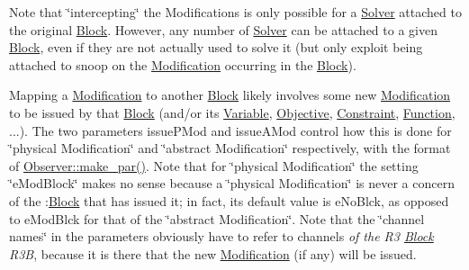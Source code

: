 Note that \char`\"{}intercepting\char`\"{} the Modifications is only possible for a \mbox{\hyperlink{class_s_m_spp__di__unipi__it_1_1_solver}{Solver}} attached to the original \mbox{\hyperlink{class_s_m_spp__di__unipi__it_1_1_block}{Block}}. However, any number of \mbox{\hyperlink{class_s_m_spp__di__unipi__it_1_1_solver}{Solver}} can be attached to a given \mbox{\hyperlink{class_s_m_spp__di__unipi__it_1_1_block}{Block}}, even if they are not actually used to solve it (but only exploit being attached to snoop on the \mbox{\hyperlink{class_s_m_spp__di__unipi__it_1_1_modification}{Modification}} occurring in the \mbox{\hyperlink{class_s_m_spp__di__unipi__it_1_1_block}{Block}}).

Mapping a \mbox{\hyperlink{class_s_m_spp__di__unipi__it_1_1_modification}{Modification}} to another \mbox{\hyperlink{class_s_m_spp__di__unipi__it_1_1_block}{Block}} likely involves some new \mbox{\hyperlink{class_s_m_spp__di__unipi__it_1_1_modification}{Modification}} to be issued by that \mbox{\hyperlink{class_s_m_spp__di__unipi__it_1_1_block}{Block}} (and/or its \mbox{\hyperlink{class_s_m_spp__di__unipi__it_1_1_variable}{Variable}}, \mbox{\hyperlink{class_s_m_spp__di__unipi__it_1_1_objective}{Objective}}, \mbox{\hyperlink{class_s_m_spp__di__unipi__it_1_1_constraint}{Constraint}}, \mbox{\hyperlink{class_s_m_spp__di__unipi__it_1_1_function}{Function}}, ...). The two parameters issue\+P\+Mod and issue\+A\+Mod control how this is done for \char`\"{}physical Modification\char`\"{} and \char`\"{}abstract
\+Modification\char`\"{} respectively, with the format of \mbox{\hyperlink{class_s_m_spp__di__unipi__it_1_1_observer_a2d499ae38e5e95cf66cd71da32b0694a}{Observer\+::make\+\_\+par()}}. Note that for \char`\"{}physical Modification\char`\"{} the setting \char`\"{}e\+Mod\+Block\char`\"{} makes no sense because a \char`\"{}physical Modification\char`\"{} is never a concern of the \+:\mbox{\hyperlink{class_s_m_spp__di__unipi__it_1_1_block}{Block}} that has issued it; in fact, its default value is e\+No\+Blck, as opposed to e\+Mod\+Blck for that of the \char`\"{}abstract Modification\char`\"{}. Note that the \char`\"{}channel
names\char`\"{} in the parameters obviously have to refer to channels {\itshape of the R3 \mbox{\hyperlink{class_s_m_spp__di__unipi__it_1_1_block}{Block}} R3B}, because it is there that the new \mbox{\hyperlink{class_s_m_spp__di__unipi__it_1_1_modification}{Modification}} (if any) will be issued.

